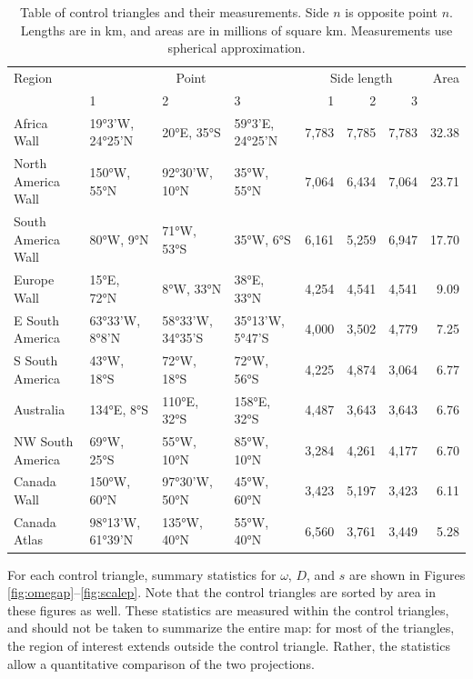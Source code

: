 \documentclass[]{interact}
\begin{document}
\begin{table}
\begin{tabular}{ p{2.5cm} | p{1.5cm} p{1.5cm} p{1.5cm} | r r r | r }
Region & \multicolumn{3}{c}{Point} & \multicolumn{3}{c}{Side length} & Area \\
& 1 & 2 & 3 & 1 & 2 & 3 & \\
\hline
Africa Wall & 19°3'W, 24°25'N & 20°E, 35°S & 59°3'E, 24°25'N & 7,783 & 7,785 & 7,783 & 32.38 \\
North \mbox{America} Wall & 150°W, 55°N & 92°30'W, 10°N & 35°W, 55°N & 7,064 & 6,434 & 7,064 & 23.71 \\
South \mbox{America} Wall & 80°W, 9°N & 71°W, 53°S & 35°W, 6°S & 6,161 & 5,259 & 6,947 & 17.70 \\
Europe Wall & 15°E, 72°N & 8°W, 33°N & 38°E, 33°N & 4,254 & 4,541 & 4,541 & 9.09 \\
E South \mbox{America} & 63°33'W, 8°8'N & 58°33'W, 34°35'S & 35°13'W, 5°47'S & 4,000 & 3,502 & 4,779 & 7.25 \\
S South \mbox{America} & 43°W, 18°S & 72°W, 18°S & 72°W, 56°S & 4,225 & 4,874 & 3,064 & 6.77 \\
Australia & 134°E, 8°S & 110°E, 32°S & 158°E, 32°S & 4,487 & 3,643 & 3,643 & 6.76 \\
NW South \mbox{America} & 69°W, 25°S & 55°W, 10°N & 85°W, 10°N & 3,284 & 4,261 & 4,177 & 6.70 \\
Canada Wall & 150°W, 60°N & 97°30'W, 50°N & 45°W, 60°N & 3,423 & 5,197 & 3,423 & 6.11 \\
Canada \mbox{Atlas} & 98°13'W, 61°39'N & 135°W, 40°N & 55°W, 40°N & 6,560 & 3,761 & 3,449 & 5.28
\end{tabular}
\caption{Table of control triangles and their measurements. Side $n$ is opposite point $n$.
Lengths are in km, and areas are in millions of square km. Measurements use spherical approximation.}
\label{table:ctrlpts}
\end{table}

For each control triangle, summary statistics for $\omega$, $D$, and $s$ are
shown in Figures \ref{fig:omegap}--\ref{fig:scalep}. Note that the control
triangles are sorted by area in these figures as well.
These statistics are measured within the control triangles,
and should not be taken to summarize the entire map: for most of the triangles,
the region of interest extends outside the control triangle.
Rather, the statistics allow a quantitative comparison of the two projections.
\end{document}
